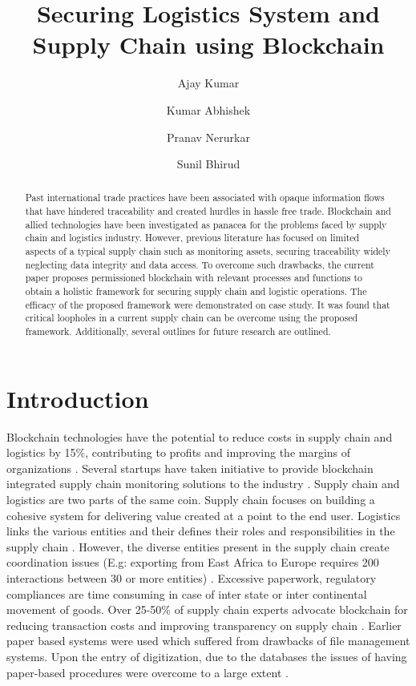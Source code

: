 \documentclass[num-refs]{wiley-article}
\title{Securing Logistics System and Supply Chain using Blockchain}
\author[1\authfn{1}]{Ajay Kumar}
\author[1]{Kumar Abhishek}
\author[2,3\authfn{1}]{Pranav Nerurkar}
\author[3]{Sunil Bhirud}
\affil[1]{Dept. of CSE, NIT Patna, Bihar, India}
\affil[2]{Dept. of Data Science, MPSTME, NMIMS, Mumbai, Maharashtra}
\affil[3]{Dept. of CE \& IT, VJTI Mumbai, Maharashtra, India}
\begin{document}
\begin{frontmatter}
\maketitle

\begin{abstract}
Past international trade practices have been associated with opaque information flows that have hindered traceability and created hurdles in hassle free trade. Blockchain and allied technologies have been investigated as panacea for the problems faced by supply chain and logistics industry. However, previous literature has focused on limited aspects of a typical supply chain such as monitoring assets, securing traceability widely neglecting data integrity and data access. To overcome such drawbacks, the current paper proposes permissioned blockchain with relevant processes and functions to obtain a holistic framework for securing supply chain and logistic operations. The efficacy of the proposed framework were demonstrated on case study. It was found that critical loopholes in a current supply chain can be overcome using the proposed framework. Additionally, several outlines for future research are outlined. 

\end{abstract}
\end{frontmatter}

\section{Introduction}

Blockchain technologies have the potential to reduce costs in supply chain and logistics by 15\%, contributing to profits and improving the margins of organizations \cite{fu2019operation}. Several startups have taken initiative to provide blockchain integrated supply chain monitoring solutions to the industry \cite{perboli2018blockchain}. Supply chain and logistics are two parts of the same coin. Supply chain focuses on building a cohesive system for delivering value created at a point to the end user. Logistics links the various entities and their defines their roles and responsibilities in the supply chain \cite{perboli2018blockchain, li2020research}. However, the diverse entities present in the supply chain create coordination issues (E.g: exporting from East Africa to Europe requires 200 interactions between 30 or more entities) \cite{chang2020blockchain, hackius2017blockchain}. Excessive paperwork, regulatory compliances are time consuming in case of inter state or inter continental movement of goods. Over 25-50\% of supply chain experts advocate blockchain for reducing transaction costs and improving transparency on supply chain \cite{kolb2019role}. Earlier paper based systems were used which suffered from drawbacks of file management systems. Upon the entry of digitization, due to the databases the issues of having paper-based procedures were overcome to a large extent \cite{paardenkooper2019creating}. 
\end{document}
